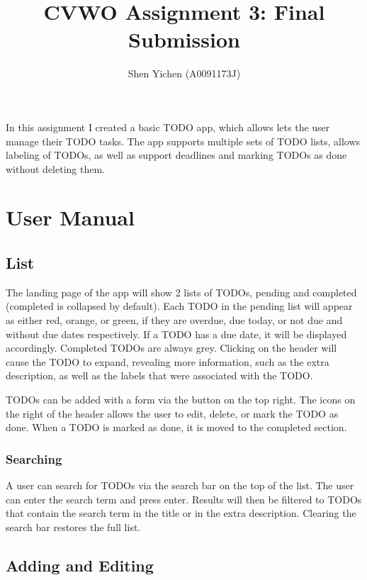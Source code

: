 \documentclass[12pt, notitlepage]{article}
\title{\textsf{\textbf{CVWO Assignment 3: Final Submission}}\vspace{-1em}}
\date{}
\author{\textsf{Shen Yichen (A0091173J)}}
\begin{document}
\begin{singlespace}
    \maketitle
    \vspace{-5em}
\end{singlespace}

In this assignment I created a basic TODO app, which allows lets the user manage their TODO tasks. The app supports multiple sets of TODO lists, allows labeling of TODOs, as well as support deadlines and marking TODOs as done without deleting them.

\section*{User Manual}

\subsection*{List}

The landing page of the app will show 2 lists of TODOs, pending and completed (completed is collapsed by default). Each TODO in the pending list will appear as either red, orange, or green, if they are overdue, due today, or not due and without due dates respectively. If a TODO has a due date, it will be displayed accordingly. Completed TODOs are always grey. Clicking on the header will cause the TODO to expand, revealing more information, such as the extra description, as well as the labels that were associated with the TODO\@.

TODOs can be added with a form via the button on the top right. The icons on the right of the header allows the user to edit, delete, or mark the TODO as done. When a TODO is marked as done, it is moved to the completed section.

\subsubsection*{Searching}

A user can search for TODOs via the search bar on the top of the list. The user can enter the search term and press enter. Results will then be filtered to TODOs that contain the search term in the title or in the extra description. Clearing the search bar restores the full list.

\subsection*{Adding and Editing}
\end{document}
